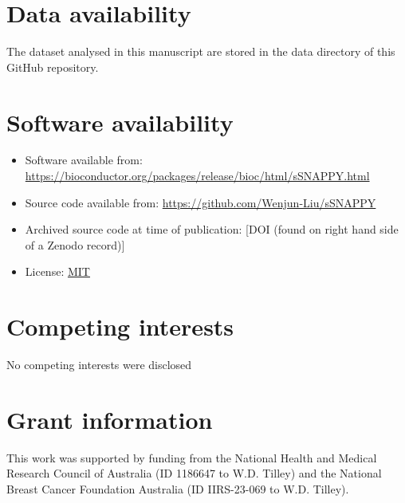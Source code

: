\documentclass[9pt,a4paper,]{extarticle}
\begin{document}
\hypertarget{data-availability}{%
\section{Data availability}\label{data-availability}}

The dataset analysed in this manuscript are stored in the data directory of this GitHub repository.

\hypertarget{software-availability}{%
\section{Software availability}\label{software-availability}}

\begin{itemize}
\item
  Software available from: \url{https://bioconductor.org/packages/release/bioc/html/sSNAPPY.html}
\item
  Source code available from: \url{https://github.com/Wenjun-Liu/sSNAPPY}
\item
  Archived source code at time of publication: {[}DOI (found on right hand side of a Zenodo record){]}
\item
  License: \href{https://opensource.org/license/mit/}{MIT}
\end{itemize}

\hypertarget{competing-interests}{%
\section{Competing interests}\label{competing-interests}}

No competing interests were disclosed

\hypertarget{grant-information}{%
\section{Grant information}\label{grant-information}}

This work was supported by funding from the National Health and Medical Research Council of Australia (ID 1186647 to W.D. Tilley) and the National Breast Cancer Foundation Australia (ID IIRS-23-069 to W.D. Tilley).

\renewcommand\refname{References}
{\small}
\end{document}
